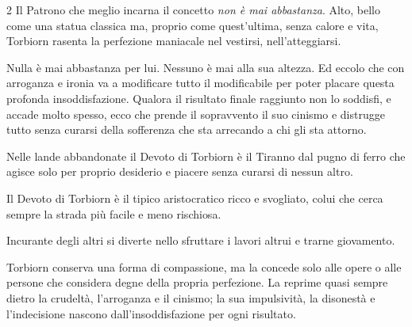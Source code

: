 \begin{multicols}{2}
Il Patrono che meglio incarna il concetto \emph{non è mai abbastanza}. Alto, bello come una statua classica ma, proprio come quest'ultima, senza calore e vita, Torbiorn rasenta la perfezione maniacale nel vestirsi, nell'atteggiarsi.

Nulla è mai abbastanza per lui. Nessuno è mai alla sua altezza. Ed eccolo che con arroganza e ironia va a modificare tutto il modificabile per poter placare questa profonda insoddisfazione. Qualora il risultato finale raggiunto non lo soddisfi, e accade molto spesso, ecco che prende il sopravvento il suo cinismo e distrugge tutto senza curarsi della sofferenza che sta arrecando a chi gli sta attorno.

Nelle lande abbandonate il Devoto di Torbiorn è il Tiranno dal pugno di ferro che agisce solo per proprio desiderio e piacere senza curarsi di nessun altro.

Il Devoto di Torbiorn è il tipico aristocratico ricco e svogliato, colui che cerca sempre la strada più facile e meno rischiosa.

Incurante degli altri si diverte nello sfruttare i lavori altrui e trarne giovamento.

Torbiorn conserva una forma di compassione, ma la concede solo alle opere o alle persone che considera degne della propria perfezione. La reprime quasi sempre dietro la crudeltà, l'arroganza e il cinismo; la sua impulsività, la disonestà e l'indecisione nascono dall'insoddisfazione per ogni risultato.


\end{multicols}
